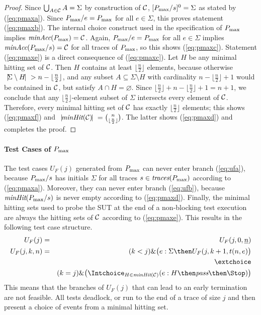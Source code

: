 \begin{proof}
Since $\bigcup_{A\in{\cal C}} A = \Sigma $ by construction of ${\cal C}$,
$[P_\text{max}/s]^0 = \Sigma$ as stated by (\ref{eq:pmaxa}). Since $P_\text{max}/e = P_\text{max}$
for all $e\in\Sigma$, this proves statement (\ref{eq:pmaxb}). The internal
choice construct used in the specification of $P_\text{max}$ implies
$\text{\it minAcc}(P_\text{max}) = {\cal C}$. Again, $P_\text{max}/e = P_\text{max}$ for all $e\in\Sigma$
implies $\text{\it minAcc}(P_\text{max}/s) = {\cal C}$ for all traces of $P_\text{max}$, so this
shows (\ref{eq:pmaxc}). Statement (\ref{eq:pmaxe}) is a direct consequence of
(\ref{eq:pmaxc}). Let $H$ be any minimal hitting set of ${\cal C}$. Then $H$
contains at least $\lfloor{\frac{n}{2}}\rfloor$ elements, because otherwise
${~|\! \Sigma\setminus H\!|~} > n-\lfloor{\frac{n}{2}}\rfloor$, and any subset
$A\subseteq \Sigma\setminus H$ with cardinality
$n-\lfloor{\frac{n}{2}}\rfloor+1$  would be contained in ${\cal C}$, but
satisfy $A\cap H=\varnothing$. Since
$\lfloor{\frac{n}{2}}\rfloor+n-\lfloor{\frac{n}{2}}\rfloor+1=n+1$, we
conclude that any $\lfloor{\frac{n}{2}}\rfloor$-element subset of $\Sigma$
intersects  every element of ${\cal C}$.  Therefore, every minimal hitting
set of ${\cal C}$ has exactly $\lfloor{\frac{n}{2}}\rfloor$ elements; this
shows (\ref{eq:pmaxf}) and ${~|\! \text{\it minHit}({\cal C})\!|~} =
\binom{n}{\lfloor{\frac{n}{2}}\rfloor}$. The latter shows  (\ref{eq:pmaxd})
and completes the proof. \xbox
\end{proof}

\paragraph{Test Cases of $P_\text{max}$} The test cases $U_F(j)$ generated from $P_\text{max}$ can
never enter branch (\ref{eq:ufa}), because $P_\text{max}/s$ has initials $\Sigma$
for all traces $s\in\text{\it traces}(P_\text{max})$ according to (\ref{eq:pmaxa}). Moreover,
they can never enter branch (\ref{eq:ufb}), because $\text{\it minHit}(P_\text{max}/s)$ is
never empty according to (\ref{eq:pmaxd}). Finally, the minimal hitting sets
used to probe the SUT at the end of a non-blocking test execution are always
the hitting sets of ${\cal C}$ according to (\ref{eq:pmaxe}). This results in
the following test case structure.
\begin{eqnarray*}
\label{eq:UFPpmax}
U_F(j) & = & U_F(j,0,\ii n)
\\
U_F(j,k,n) & = &   (k < j) \& \big(e:\Sigma   \then U_F(j,k+1,t(n,e) \big)
\\ & & \extchoice
\\ & & (k = j) \& \big( \Intchoice_{H\in\minhits({\cal C})} (e:H   \then \epass \then\Stop   )  \big)
\end{eqnarray*}
This means that the branches of $U_F(j)$ that can lead to an early
termination are not feasible. All tests deadlock, or run to the end of a
trace of size $j$ and then present a choice of events from a minimal hitting
set.

